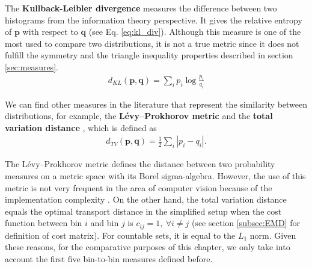 The \textbf{Kullback-Leibler divergence} \citep{Kullback.Leibler:IMS:1951}  measures the difference between two histograms from the information theory perspective. It gives the relative entropy of $\mathbf{p}$ with respect to $\mathbf{q}$ (see Eq. \eqref{eq:kl_div}). Although this measure is one of the most used to compare two distributions, it is not a true metric since it does not fulfill the symmetry and the triangle inequality properties described in section \ref{sec:measures}.
\begin{eqnarray}
d_{KL}(\mathbf{p}, \mathbf{q}) = \sum\nolimits_{i}p_i \log\frac{p_i}{q_i} \label{eq:kl_div}
\end{eqnarray}

We can find other measures in the literature that represent the similarity between distributions, for example, the \textbf{Lévy–Prokhorov metric} \citep{Prokhorov:TPA:1956} and the \textbf{total variation distance} \citep{Bogachev.Kolesnikov:RMS:2012}, which is defined as
\begin{eqnarray}
d_{TV}(\mathbf{p}, \mathbf{q}) = \frac{1}{2}\sum\nolimits_{i}|p_i - q_i |. \label{eq:tv_dist}
\end{eqnarray}

The Lévy–Prokhorov metric defines the distance between two probability measures on a metric space with its Borel sigma-algebra. However, the use of this metric is not very frequent in the area of computer vision because of the implementation complexity \citep{Bogachev.Kolesnikov:RMS:2012}. On the other hand, the total variation distance equals the optimal transport distance \citep{Cuturi.Avis:JMLR:2011} in the simplified setup when the cost function between bin $i$ and bin $j$ is $c_{ij}=1,\ \forall i\neq j$ (see section \ref{subsec:EMD} for definition of cost matrix). For countable sets, it is equal to the $L_1$ norm. Given these reasons, for the comparative purposes of this chapter, we only take into account the first five bin-to-bin measures defined before.



